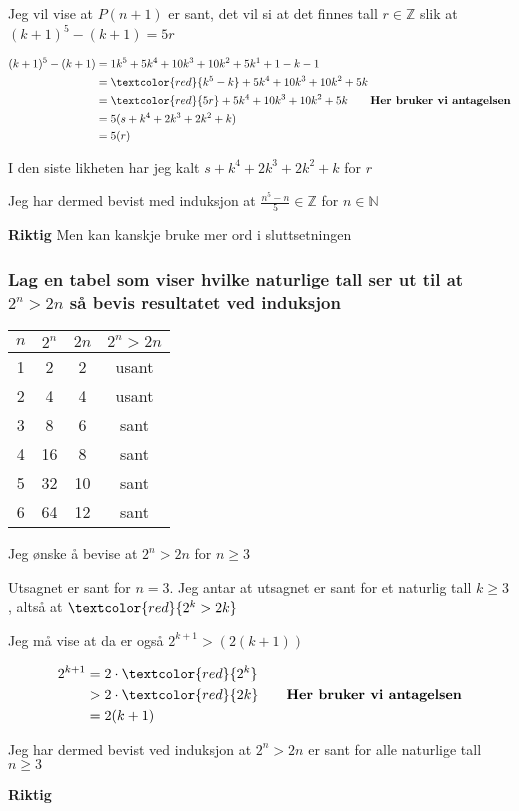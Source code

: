 \documentclass{article}
\begin{document}
Jeg vil vise at $P(n+1)$ er sant, det vil si at det finnes tall $r \in \mathbb{Z}$ slik at $(k+1)^5-(k+1)=5r$

\begin{align*}
    (k+1)^5-(k+1) &= 1k^5+5k^4+10k^3+10k^2+5k^1+1-k-1 \\
    &= \textcolor{red}{k^5-k}+5k^4+10k^3+10k^2+5k \\
    &= \textcolor{red}{5r}+5k^4+10k^3+10k^2+5k \qquad \textbf{Her bruker vi antagelsen}\\
    &= 5(s+k^4+2k^3+2k^2+k) \\
    &= 5(r)
\end{align*}

I den siste likheten har jeg kalt $s+k^4+2k^3+2k^2+k$ for $r$

Jeg har dermed bevist med induksjon at $\frac{n^5-n}{5} \in \mathbb{Z}$ for $n \in \mathbb{N}$

\textbf{Riktig}
Men kan kanskje bruke mer ord i sluttsetningen

\subsubsection{Lag en tabel som viser hvilke naturlige tall ser ut til at $2^n > 2n$ så bevis resultatet ved induksjon}

\begin{tabular}{|c|c|c|c|}
    \hline
    $n$ & $2^n$ & $2n$ & $2^n > 2n$ \\
    \hline
    1 & 2 & 2 & usant \\
    2 & 4 & 4 & usant \\
    3 & 8 & 6 & sant \\
    4 & 16 & 8 & sant \\
    5 & 32 & 10 & sant \\
    6 & 64 & 12 & sant \\
    \hline
\end{tabular}

Jeg ønske å bevise at $2^n > 2n$ for $n \ge 3$

Utsagnet er sant for $n=3$. Jeg antar at utsagnet er sant for et naturlig tall $k \ge 3$, altså at $\textcolor{red}{2^k > 2k}$

Jeg må vise at da er også $2^{k+1} > (2(k+1))$

\begin{align*}
2^{k+1} &= 2 \cdot \textcolor{red}{2^k} \\
&> 2 \cdot \textcolor{red}{2k} \qquad \textbf{Her bruker vi antagelsen} \\
&= 2(k+1)
\end{align*}

Jeg har dermed bevist ved induksjon at $2^n > 2n$ er sant for alle naturlige tall $n \ge 3$

\textbf{Riktig}



\end{document}
